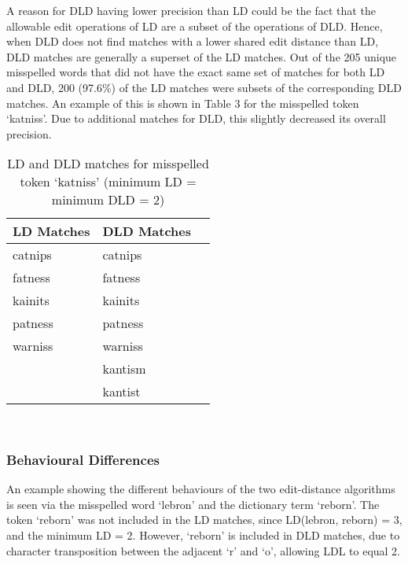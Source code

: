 \documentclass[11pt]{article}
\begin{document}
A reason for DLD having lower precision than LD could be the fact that the allowable edit operations of LD are a subset of the operations of DLD. Hence, when DLD does not find matches with a lower shared edit distance than LD, DLD matches are generally a superset of the LD matches. Out of the 205 unique misspelled words that did not have the exact same set of matches for both LD and DLD, 200 (97.6\%) of the LD matches were subsets of the corresponding DLD matches. An example of this is shown in Table 3 for the misspelled token `katniss'. Due to additional matches for DLD, this slightly decreased its overall precision.
\begin{table}
\begin{center}
\begin{tabular}{ |l|l|l| }
\hline
LD Matches & DLD Matches \\
\hline
catnips & catnips\\
fatness & fatness\\ 
kainits & kainits\\
patness & patness\\
warniss & warniss\\
 & kantism\\
 & kantist\\
\hline
\end{tabular}
\caption{LD and DLD matches for misspelled token `katniss' (minimum LD = minimum DLD = 2)}\label{table3}
\end{center}
\end{table}
\\

\subsubsection{Behavioural Differences}
An example showing the different behaviours of the two edit-distance algorithms is seen via the misspelled word `lebron' and the dictionary term `reborn'. The token `reborn' was not included in the LD matches, since LD(lebron, reborn) = 3, and the minimum LD = 2. However, `reborn' is included in DLD matches, due to character transposition between the adjacent `r' and `o', allowing LDL to equal 2.
\\
\end{document}
